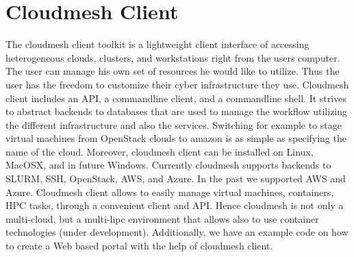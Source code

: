 \section{Cloudmesh Client}
\label{S:cmclient}

The cloudmesh client toolkit is a lightweight client interface of
accessing heterogeneous clouds, clusters, and workstations right from
the users computer. The user can manage his own set of resources he
would like to utilize. Thus the user has the freedom to customize
their cyber infrastructure they use. Cloudmesh client includes an API,
a commandline client, and a commandline shell. It strives to abstract
backends to databases that are used to manage the workflow utilizing
the different infrastructure and also the services. Switching for
example to stage virtual machines from OpenStack clouds to amazon is
as simple as specifying the name of the cloud. Moreover, cloudmesh
client can be installed on Linux, MacOSX, and in future
Windows. Currently cloudmesh supports backends to SLURM, SSH,
OpenStack, AWS, and Azure. In the past we supported AWS and Azure.
Cloudmesh client allows to easily manage virtual machines, containers,
HPC tasks, through a convenient client and API. Hence cloudmesh is not
only a multi-cloud, but a multi-hpc environment that allows also to
use container technologies (under development). Additionally, we have
an example code on how to create a Web based portal with the help of
cloudmesh client.

